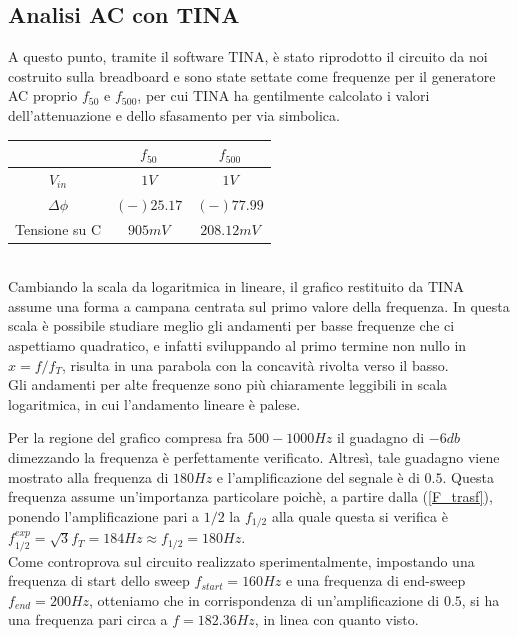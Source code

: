 \documentclass[journal, a4paper]{IEEEtran}
\begin{document}
\subsection{Analisi AC con TINA}
A questo punto, tramite il software \textsc{TINA}, è stato riprodotto il circuito da noi costruito sulla breadboard e sono state settate come frequenze per il generatore AC proprio  $f_{50}$ e $f_{500}$, per cui \textsc{TINA} ha gentilmente calcolato i valori dell'attenuazione e dello sfasamento per via simbolica. \\

\begin{tabular}{|c|c|c|}
\hline  & $f_{50}$ & $f_{500}$ \\ 
\hline $V_{in}$ & $1 \si{V}$ & $1 \si{V}$ \\ 
\hline $\Delta \phi $& $(-)25.17$  & $(-)77.99$ \\ 
\hline Tensione su C & $905 \si{mV}$ & $208.12 \si{mV}$ \\ 
\hline 
\end{tabular} \\

Cambiando la scala da logaritmica in lineare, il grafico restituito da \textsc{TINA} assume una forma a campana centrata sul primo valore della frequenza. In questa scala è possibile studiare meglio gli andamenti per basse frequenze che ci aspettiamo quadratico, e infatti sviluppando al primo termine non nullo in $x= f/f_T$, risulta in una parabola con la concavità rivolta verso il basso. \\
Gli andamenti per alte frequenze sono più chiaramente leggibili in scala logaritmica, in cui l'andamento lineare è palese.

Per la regione del grafico compresa fra $500-1000 \si{Hz}$ il guadagno di $-6db$ dimezzando la frequenza è perfettamente verificato. Altresì, tale guadagno viene mostrato alla frequenza di $180\si{Hz}$ e l'amplificazione del segnale è di $0.5$. Questa frequenza assume un'importanza particolare poichè, a partire dalla (\ref{F_trasf}), ponendo l'amplificazione pari a $1/2$ la $f_{1/2}$ alla quale questa si verifica è $f_{1/2}^{exp} = \sqrt{3}f_T = 184 \si{Hz} \approx f_{1/2} = 180 \si{Hz} $.\\

Come controprova sul circuito realizzato sperimentalmente, impostando una frequenza di start dello sweep $f_{start} = 160 \si{Hz}$ e una frequenza di end-sweep $f_{end} = 200 \si{Hz}$, otteniamo che in corrispondenza di un'amplificazione di $0.5$, si ha una frequenza pari circa a $f = 182.36 \si{Hz}$, in linea con quanto visto.
\end{document}
